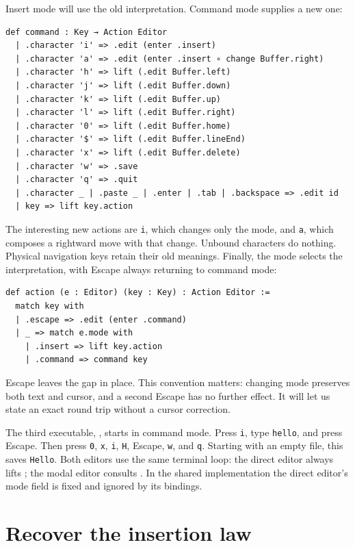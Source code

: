 \documentclass[11pt]{article}
\newcommand{\code}[1]{\texttt{\detokenize{#1}}}
\begin{document}
Insert mode will use the old interpretation. Command mode supplies a new one:
\begin{lstlisting}[language=Lean]
def command : Key → Action Editor
  | .character 'i' => .edit (enter .insert)
  | .character 'a' => .edit (enter .insert ∘ change Buffer.right)
  | .character 'h' => lift (.edit Buffer.left)
  | .character 'j' => lift (.edit Buffer.down)
  | .character 'k' => lift (.edit Buffer.up)
  | .character 'l' => lift (.edit Buffer.right)
  | .character '0' => lift (.edit Buffer.home)
  | .character '$' => lift (.edit Buffer.lineEnd)
  | .character 'x' => lift (.edit Buffer.delete)
  | .character 'w' => .save
  | .character 'q' => .quit
  | .character _ | .paste _ | .enter | .tab | .backspace => .edit id
  | key => lift key.action
\end{lstlisting}
The interesting new actions are \texttt{i}, which changes only the mode, and
\texttt{a}, which composes a rightward move with that change. Unbound characters
do nothing. Physical navigation keys retain their old meanings. Finally, the
mode selects the interpretation, with Escape always returning to command mode:
\begin{lstlisting}[language=Lean]
def action (e : Editor) (key : Key) : Action Editor :=
  match key with
  | .escape => .edit (enter .command)
  | _ => match e.mode with
    | .insert => lift key.action
    | .command => command key
\end{lstlisting}
Escape leaves the gap in place. This convention matters: changing mode preserves
both text and cursor, and a second Escape has no further effect. It will let us
state an exact round trip without a cursor correction.

The third executable, \code{lean-editor}, starts in command mode. Press
\texttt{i}, type \texttt{hello}, and press Escape. Then press \texttt{0},
\texttt{x}, \texttt{i}, \texttt{H}, Escape, \texttt{w}, and \texttt{q}.
Starting with an empty file, this saves \texttt{Hello}. Both editors use the
same terminal loop: the direct editor always lifts \code{Key.action}; the modal
editor consults \code{Editor.action}. In the shared implementation the direct
editor's mode field is fixed and ignored by its bindings.

\section{Recover the insertion law}
\label{sec:session}
\end{document}
